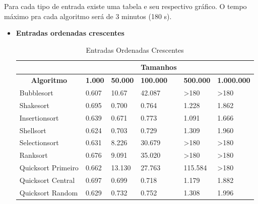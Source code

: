 \documentclass{article}
\begin{document}
\begin{flushleft}
\hspace{10mm} Para cada tipo de entrada existe uma tabela e seu respectivo gráfico. O tempo máximo pra cada algoritmo será de 3 minutos (180 s).\\ [1.5cm]

\begin{itemize}
\item \textbf{ Entradas ordenadas crescentes} 

\begin{table}[ht]
\centering
\caption{Entradas Ordenadas Crescentes}
\label{my-label}

\begin{tabular}{l|lllll|}

\cline{2-6}
                                                  &                &           &    \textbf{Tamanhos}& &         \\ \hline
\multicolumn{1}{|c|}{\textbf{Algoritmo}}  & \textbf{1.000     } & \textbf{50.000     } & \textbf{100.000} & \textbf{500.000     } & \textbf{1.000.000      } \\ \hline
\multicolumn{1}{|l|}{Bubblesort} & 0.607          & 10.67           & 42.087           & \textgreater180  & \textgreater180    \\ \hline
\multicolumn{1}{|l|}{Shakesort}           & 0.695          & 0.700           & 0.764            & 1.228            & 1.862              \\ \hline
\multicolumn{1}{|l|}{Insertionsort}       & 0.639          & 0.671           & 0.773            & 1.091            & 1.666              \\ \hline
\multicolumn{1}{|l|}{Shellsort}           & 0.624          & 0.703           & 0.729            & 1.309            & 1.960              \\ \hline
\multicolumn{1}{|l|}{Selectionsort}       & 0.631          & 8.226           & 30.679           & \textgreater180  & \textgreater180    \\ \hline
\multicolumn{1}{|l|}{Ranksort}            & 0.676          & 9.091           & 35.020           & \textgreater180  & \textgreater180    \\ \hline
\multicolumn{1}{|l|}{Quicksort Primeiro}  & 0.662          & 13.130          & 27.763           & 115.584          & \textgreater180    \\ \hline
\multicolumn{1}{|l|}{Quicksort Central}   & 0.697          & 0.699           & 0.718            & 1.179            & 1.882              \\ \hline
\multicolumn{1}{|l|}{Quicksort Random}    & 0.629          & 0.732           & 0.752            & 1.308            & 1.996              \\ \hline

\end{tabular}
\end{table}
\end{itemize}
\end{flushleft}
\end{document}
